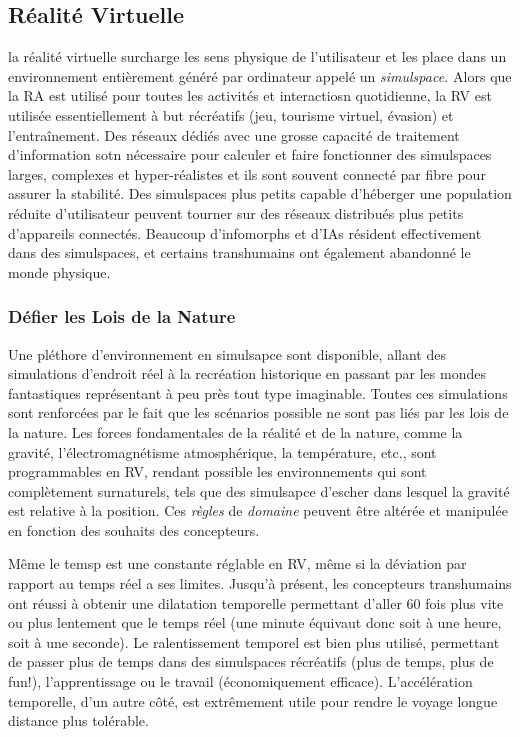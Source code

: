 \subsection{Réalité Virtuelle} 

la réalité virtuelle surcharge les sens physique de l'utilisateur et les place dans un environnement entièrement généré par ordinateur appelé un \textit{simulspace.} Alors que la RA est utilisé pour toutes les activités et interactiosn quotidienne, la RV est utilisée essentiellement à but récréatifs (jeu, tourisme virtuel, évasion) et l'entraînement. Des réseaux dédiés avec une grosse capacité de traitement d'information sotn nécessaire pour calculer et faire fonctionner des simulspaces larges, complexes et hyper-réalistes et ils sont souvent connecté par fibre pour assurer la stabilité. Des simulspaces plus petits capable d'héberger une population réduite d'utilisateur peuvent tourner sur des réseaux distribués plus petits d'appareils connectés. Beaucoup d'infomorphs et d'IAs résident effectivement dans des simulspaces, et certains transhumains ont également abandonné le monde physique. 



\subsubsection{Défier les Lois de la Nature} 

Une pléthore d'environnement en simulsapce sont disponible, allant des simulations d'endroit réel à la recréation historique en passant par les mondes fantastiques représentant à peu près tout type imaginable. Toutes ces simulations sont renforcées par le fait que les scénarios possible ne sont pas liés par les lois de la nature. Les forces fondamentales de la réalité et de la nature, comme la gravité, l'électromagnétisme atmosphérique, la température, etc., sont programmables en RV, rendant possible les environnements qui sont complètement surnaturels, tels que des simulsapce d'escher dans lesquel la gravité  est relative à la position. Ces \textit{règles }de \textit{domaine} peuvent être altérée et manipulée en fonction des souhaits des concepteurs. 

Même le temsp est une constante réglable en RV, même si la déviation par rapport au temps réel a ses limites. Jusqu'à présent, les concepteurs transhumains ont réussi à obtenir une dilatation temporelle permettant d'aller 60 fois plus vite ou plus lentement que le temps réel (une minute équivaut donc soit à une heure, soit à une seconde). Le ralentissement temporel est bien plus utilisé, permettant de passer plus de temps dans des simulspaces récréatifs (plus de temps, plus de fun!), l'apprentissage ou le travail (économiquement efficace). L'accélération temporelle, d'un autre côté, est extrêmement utile pour rendre le voyage longue distance plus tolérable. 

